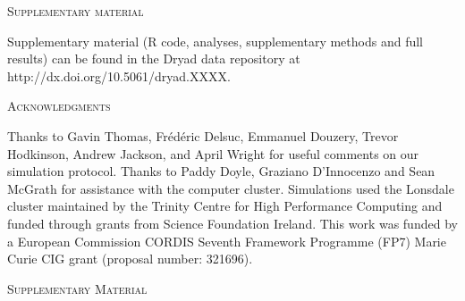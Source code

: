 \documentclass[12pt,letterpaper]{article}
\renewcommand{\section}[1]{%
\bigskip
\begin{center}
\begin{Large}
\normalfont\scshape #1
\medskip
\end{Large}
\end{center}}
\begin{document}
\section{Supplementary material}
Supplementary material (R code, analyses, supplementary methods and full results) can be found in the Dryad data repository at http://dx.doi.org/10.5061/dryad.XXXX.

\section{Acknowledgments}
Thanks to Gavin Thomas, Fr\'{e}d\'{e}ric Delsuc, Emmanuel Douzery, Trevor Hodkinson, Andrew Jackson, and April Wright for useful comments on our simulation protocol. Thanks to Paddy Doyle, Graziano D'Innocenzo and Sean McGrath for assistance with the computer cluster. Simulations used the Lonsdale cluster maintained by the Trinity Centre for High Performance Computing and funded through grants from Science Foundation Ireland. This work was funded by a European Commission CORDIS Seventh Framework Programme (FP7) Marie Curie CIG grant (proposal number: 321696).





%
%
\section{Supplementary Material}

    
    \label{SupplementaryMaterial}

\end{document}
